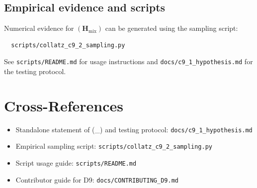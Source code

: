 \documentclass[11pt,a4paper]{article}
\newcommand{\Hmix}{(\mathbf{H}_{\mathrm{mix}})}     %
\begin{document}
\subsection*{Empirical evidence and scripts}

Numerical evidence for $\Hmix$ can be generated using the sampling script:
\begin{verbatim}
  scripts/collatz_c9_2_sampling.py
\end{verbatim}
See \texttt{scripts/README.md} for usage instructions and
\texttt{docs/c9\_1\_hypothesis.md} for the testing protocol.

\section{Cross-References}

\begin{itemize}
  \item Standalone statement of \Hmix{} and testing protocol:
        \texttt{docs/c9\_1\_hypothesis.md}
  \item Empirical sampling script:
        \texttt{scripts/collatz\_c9\_2\_sampling.py}
  \item Script usage guide:
        \texttt{scripts/README.md}
  \item Contributor guide for D9:
        \texttt{docs/CONTRIBUTING\_D9.md}
\end{itemize}
\end{document}
